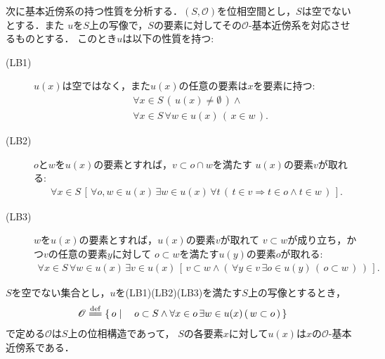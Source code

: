 	次に基本近傍系の持つ性質を分析する．$(S,\mathscr{O})$を位相空間とし，$S$は空でないとする．また
	$u$を$S$上の写像で，$S$の要素に対してその$\mathscr{O}$-基本近傍系を対応させるものとする．
	このとき$u$は以下の性質を持つ:
	\begin{description}
		\item[(LB1)] $u(x)$は空ではなく，また$u(x)$の任意の要素は$x$を要素に持つ:
			\begin{align}
				&\forall x \in S\, (\, u(x) \neq \emptyset\, ) \wedge\\
				&\forall x \in S\, \forall w \in u(x)\, (\, x \in w\, ).
			\end{align}

		\item[(LB2)] $o$と$w$を$u(x)$の要素とすれば，$v \subset o \cap w$を満たす
			$u(x)$の要素$v$が取れる:
			\begin{align}
				\forall x \in S\, 
				\left[\, \forall o,w \in u(x)\, \exists w \in u(x)\,
				\forall t\, \left(\, t \in v \Longrightarrow t \in o \wedge t \in w\, \right)\, \right].
			\end{align}
			
		\item[(LB3)] $w$を$u(x)$の要素とすれば，$u(x)$の要素$v$が取れて
			$v \subset w$が成り立ち，かつ$v$の任意の要素$y$に対して
			$o \subset w$を満たす$u(y)$の要素$o$が取れる:
			\begin{align}
				\forall x \in S\, \forall w \in u(x)\, \exists v \in u(x)\,
				\left[\, v \subset w \wedge \left(\, \forall y \in v\,
				\exists o \in u(y)\, (\, o \subset w\, )\, \right)\, \right].
			\end{align}
	\end{description}
	
	\begin{screen}
		\begin{thm}[与えられた集合を基本近傍系とする位相の生成]
		\label{thm:a_local_base_restores_the_topology}
			$S$を空でない集合とし，$u$を(LB1)(LB2)(LB3)を満たす$S$上の写像とするとき，
			\begin{align}
				\mathscr{O} \defeq
				\Set{o}{o \subset S \wedge \forall x \in o\, \exists w \in u(x)\, (\, w \subset o\, )}
			\end{align}
			で定める$\mathscr{O}$は$S$上の位相構造であって，
			$S$の各要素$x$に対して$u(x)$は$x$の$\mathscr{O}$-基本近傍系である．
		\end{thm}
	\end{screen}
	
